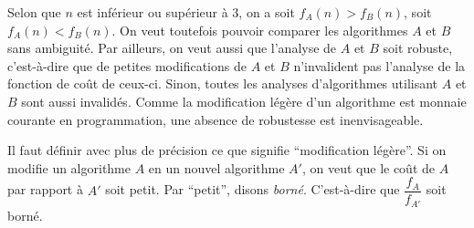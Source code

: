 \documentclass[../../../main.tex]{subfiles}
\begin{document}
\begin{minipage}{\textwidth}
	\begin{center}
	\end{center}
\end{minipage}
Selon que $n$ est inférieur ou supérieur à $3$, on a soit $f_A(n) > f_B(n)$, soit $f_A(n) < f_B(n)$. On veut toutefois pouvoir comparer les algorithmes $A$ et $B$ sans ambiguité. Par ailleurs, on veut aussi que l'analyse de $A$ et $B$ soit robuste, c'est-à-dire que de petites modifications de $A$ et $B$ n'invalident pas l'analyse de la fonction de coût de ceux-ci. Sinon, toutes les analyses d'algorithmes utilisant $A$ et $B$ sont aussi invalidés. Comme la modification légère d'un algorithme est monnaie courante en programmation, une absence de robustesse est inenvisageable.

Il faut définir avec plus de précision ce que signifie ``modification légère''. Si on modifie un algorithme $A$ en un nouvel algorithme $A'$, on veut que le coût de $A$ par rapport à $A'$ soit petit. Par ``petit'', disons \textit{borné}. C'est-à-dire que $\dfrac{f_A}{f_{A'}}$ soit borné.
\end{document}
